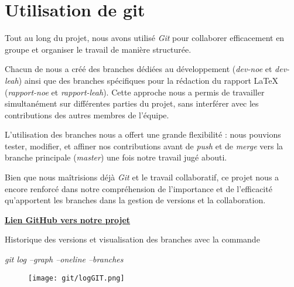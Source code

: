 \section{Utilisation de git}

Tout au long du projet, nous avons utilisé \textit{Git} pour collaborer efficacement en groupe et organiser le travail de manière structurée.  

Chacun de nous a créé des branches dédiées au développement (\textit{dev-noe} et \textit{dev-leah}) ainsi que des branches spécifiques pour la rédaction du rapport LaTeX (\textit{rapport-noe} et \textit{rapport-leah}). Cette approche nous a permis de travailler simultanément sur différentes parties du projet, sans interférer avec les contributions des autres membres de l’équipe.  

L’utilisation des branches nous a offert une grande flexibilité : nous pouvions tester, modifier, et affiner nos contributions avant de \textit{push} et de \textit{merge} vers la branche principale (\textit{master}) une fois notre travail jugé abouti.  

Bien que nous maîtrisions déjà \textit{Git} et le travail collaboratif, ce projet nous a encore renforcé dans notre compréhension de l’importance et de l’efficacité qu’apportent les branches dans la gestion de versions et la collaboration.

\begin{center}
    \href{https://github.com/NMercierBr/PowerGridStudent/tree/master}{\textbf{Lien GitHub vers notre projet}}
    
\end{center}

\pagebreak

\vspace{1cm}

Historique des versions et visualisation des branches avec la commande \\ 
\begin{center}
    \textit{ 
        git log --graph --oneline --branches}
\end{center}

\begin{figure}[h]
    \centering
    \texttt{[image: git/logGIT.png]}
\end{figure}